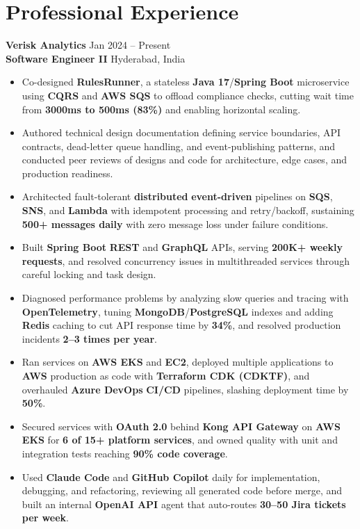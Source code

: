 \documentclass[a4paper,10pt]{article}
\begin{document}
\section*{Professional Experience}

\textbf{Verisk Analytics} \hfill Jan 2024 -- Present \\
\textbf{Software Engineer II} \hfill Hyderabad, India

\begin{itemize}[leftmargin=*]
    \item Co-designed \textbf{RulesRunner}, a stateless \textbf{Java 17}/\textbf{Spring Boot} microservice using \textbf{CQRS} and \textbf{AWS SQS} to offload compliance checks, cutting wait time from \textbf{3000ms to 500ms (83\%)} and enabling horizontal scaling.
    \item Authored technical design documentation defining service boundaries, API contracts, dead-letter queue handling, and event-publishing patterns, and conducted peer reviews of designs and code for architecture, edge cases, and production readiness.
    \item Architected fault-tolerant \textbf{distributed} \textbf{event-driven} pipelines on \textbf{SQS}, \textbf{SNS}, and \textbf{Lambda} with idempotent processing and retry/backoff, sustaining \textbf{500+ messages daily} with zero message loss under failure conditions.
    \item Built \textbf{Spring Boot} \textbf{REST} and \textbf{GraphQL} APIs, serving \textbf{200K+ weekly requests}, and resolved concurrency issues in multithreaded services through careful locking and task design.
    \item Diagnosed performance problems by analyzing slow queries and tracing with \textbf{OpenTelemetry}, tuning \textbf{MongoDB}/\textbf{PostgreSQL} indexes and adding \textbf{Redis} caching to cut API response time by \textbf{34\%}, and resolved production incidents \textbf{2--3 times per year}.
    \item Ran services on \textbf{AWS EKS} and \textbf{EC2}, deployed multiple applications to \textbf{AWS} production as code with \textbf{Terraform CDK (CDKTF)}, and overhauled \textbf{Azure DevOps} \textbf{CI/CD} pipelines, slashing deployment time by \textbf{50\%}.
    \item Secured services with \textbf{OAuth 2.0} behind \textbf{Kong API Gateway} on \textbf{AWS EKS} for \textbf{6 of 15+ platform services}, and owned quality with unit and integration tests reaching \textbf{90\% code coverage}.
    \item Used \textbf{Claude Code} and \textbf{GitHub Copilot} daily for implementation, debugging, and refactoring, reviewing all generated code before merge, and built an internal \textbf{OpenAI API} agent that auto-routes \textbf{30--50 Jira tickets per week}.
\end{itemize}
\end{document}
